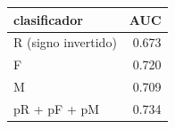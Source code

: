 \begin{tabular}{lr}
\toprule
clasificador & AUC \\
\midrule
R (signo invertido) & 0.673 \\
F & 0.720 \\
M & 0.709 \\
pR + pF + pM & 0.734 \\
\bottomrule
\end{tabular}
